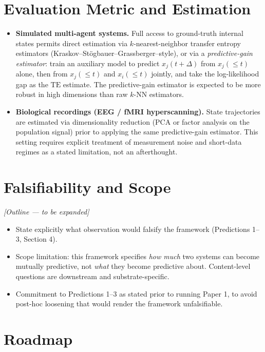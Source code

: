 \documentclass[11pt]{article}
\begin{document}
\section{Evaluation Metric and Estimation}

\begin{itemize}[leftmargin=1.2em]
    \item \textbf{Simulated multi-agent systems.} Full access to ground-truth internal states permits direct estimation via $k$-nearest-neighbor transfer entropy estimators (Kraskov--St\"ogbauer--Grassberger--style), or via a \emph{predictive-gain estimator}: train an auxiliary model to predict $x_j(t+\Delta)$ from $x_j(\leq t)$ alone, then from $x_j(\leq t)$ and $x_i(\leq t)$ jointly, and take the log-likelihood gap as the $\mathrm{TE}$ estimate. The predictive-gain estimator is expected to be more robust in high dimensions than raw $k$-NN estimators.
    \item \textbf{Biological recordings (EEG / fMRI hyperscanning).} State trajectories are estimated via dimensionality reduction (PCA or factor analysis on the population signal) prior to applying the same predictive-gain estimator. This setting requires explicit treatment of measurement noise and short-data regimes as a stated limitation, not an afterthought.
\end{itemize}

\section{Falsifiability and Scope}

\textit{[Outline --- to be expanded]}

\begin{itemize}[leftmargin=1.2em]
    \item State explicitly what observation would falsify the framework (Predictions 1--3, Section 4).
    \item Scope limitation: this framework specifies \emph{how much} two systems can become mutually predictive, not \emph{what} they become predictive about. Content-level questions are downstream and substrate-specific.
    \item Commitment to Predictions 1--3 as stated prior to running Paper 1, to avoid post-hoc loosening that would render the framework unfalsifiable.
\end{itemize}

\section{Roadmap}
\end{document}
